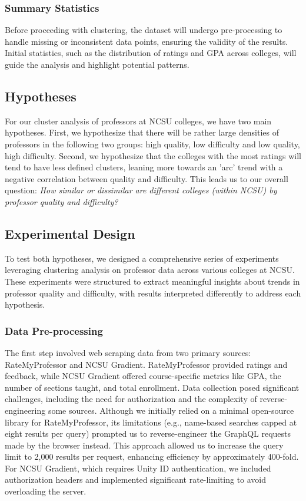 \documentclass[sigconf,nonacm]{acmart}
\begin{document}
\subsubsection{Summary Statistics}

Before proceeding with clustering, the dataset will undergo pre-processing to handle missing or inconsistent data points, ensuring the validity of the results. Initial statistics, such as the distribution of ratings and GPA across colleges, will guide the analysis and highlight potential patterns.


\subsection{Hypotheses}
For our cluster analysis of professors at NCSU colleges, we have two main hypotheses. First, we hypothesize that there will be rather large densities of professors in the following two groups: high quality, low difficulty and low quality, high difficulty. Second, we hypothesize that the colleges with the most ratings will tend to have less defined clusters, leaning more towards an 'arc' trend with a negative correlation between quality and difficulty. This leads us to our overall question: \textit{How similar or dissimilar are different colleges (within NCSU) by professor quality and difficulty?}

\subsection{Experimental Design}
To test both hypotheses, we designed a comprehensive series of experiments leveraging clustering analysis on professor data across various colleges at NCSU. These experiments were structured to extract meaningful insights about trends in professor quality and difficulty, with results interpreted differently to address each hypothesis.

\subsubsection{Data Pre-processing}
The first step involved web scraping data from two primary sources: RateMyProfessor and NCSU Gradient. RateMyProfessor provided ratings and feedback, while NCSU Gradient offered course-specific metrics like GPA, the number of sections taught, and total enrollment. Data collection posed significant challenges, including the need for authorization and the complexity of reverse-engineering some sources. Although we initially relied on a minimal open-source library for RateMyProfessor, its limitations (e.g., name-based searches capped at eight results per query) prompted us to reverse-engineer the GraphQL requests made by the browser instead. This approach allowed us to increase the query limit to 2,000 results per request, enhancing efficiency by approximately 400-fold. For NCSU Gradient, which requires Unity ID authentication, we included authorization headers and implemented significant rate-limiting to avoid overloading the server.
\end{document}
